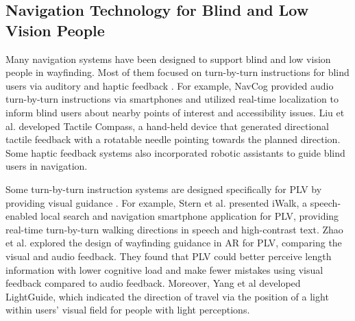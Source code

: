 




\subsection{Navigation Technology for Blind and Low Vision People}

Many navigation systems have been designed to support blind and low vision people in wayfinding. Most of them focused on turn-by-turn instructions for blind users via auditory \cite{gaunet2006verbal, helal2001drishti, ahmetovic2016navcog, simoes2016blind} and haptic feedback \cite{ertan1998wearable, azenkot2011smartphone, flores2015vibrotactile, liu2021tactile}. For example, NavCog \cite{ahmetovic2016navcog} provided audio turn-by-turn instructions via smartphones and utilized real-time localization to inform blind users about nearby points of interest and accessibility issues. Liu et al. \cite{liu2021tactile} developed Tactile Compass, a hand-held device that generated directional tactile feedback with a rotatable needle pointing towards the planned direction. Some haptic feedback systems also incorporated robotic assistants \cite{lacey1998application, kulyukin2005robocart, guerreiro2019cabot} to guide blind users in navigation.

Some turn-by-turn instruction systems are designed specifically for PLV by providing visual guidance \cite{chi2022enabling, zhao2020effectiveness,yang2021lightguide}. For example, Stern et al. \cite{stent2010iwalk} presented iWalk, a speech-enabled local search and navigation smartphone application for PLV, providing real-time turn-by-turn walking directions in speech and high-contrast text. Zhao et al. \cite{zhao2020effectiveness} explored the design of wayfinding guidance in AR for PLV, comparing the visual and audio feedback. They found that PLV could better perceive length information with lower cognitive load and make fewer mistakes using visual feedback compared to audio feedback. Moreover, %
Yang et al \cite{yang2021lightguide} developed LightGuide, which indicated the direction of travel via the position of a light within users’ visual field for people with light perceptions. 

